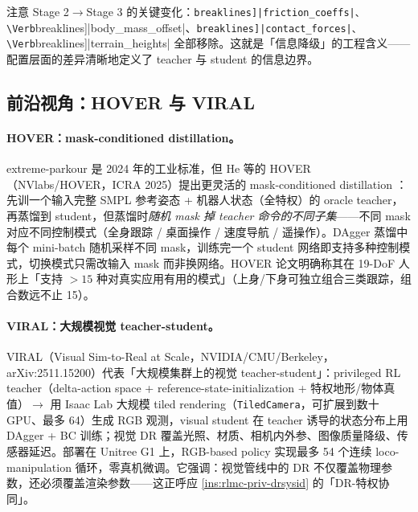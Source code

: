 注意 Stage 2$\to$Stage 3 的关键变化：\Verb[breaklines]|friction_coeffs|、\Verb[breaklines]|body_mass_offset|、\Verb[breaklines]|contact_forces|、\Verb[breaklines]|terrain_heights| 全部移除。这就是「信息降级」的工程含义——配置层面的差异清晰地定义了 teacher 与 student 的信息边界。

\subsection{前沿视角：HOVER 与 VIRAL}
\label{sec:rlmc-priv-frontier}

\paragraph{HOVER：mask-conditioned distillation。} extreme-parkour 是 2024 年的工业标准，但 He 等的 HOVER（NVlabs/HOVER，ICRA 2025）提出更灵活的 mask-conditioned distillation \cite{he2025hover}：先训一个输入完整 SMPL 参考姿态 + 机器人状态（全特权）的 oracle teacher，再蒸馏到 student，但蒸馏时\emph{随机 mask 掉 teacher 命令的不同子集}——不同 mask 对应不同控制模式（全身跟踪 / 桌面操作 / 速度导航 / 遥操作）。DAgger 蒸馏中每个 mini-batch 随机采样不同 mask，训练完一个 student 网络即支持多种控制模式，切换模式只需改输入 mask 而非换网络。HOVER 论文明确称其在 19-DoF 人形上「支持 $>15$ 种对真实应用有用的模式」（上身/下身可独立组合三类跟踪，组合数远不止 15）。

\paragraph{VIRAL：大规模视觉 teacher-student。} VIRAL（Visual Sim-to-Real at Scale，NVIDIA/CMU/Berkeley，arXiv:2511.15200）代表「大规模集群上的视觉 teacher-student」\cite{he2025viral}：privileged RL teacher（delta-action space + reference-state-initialization + 特权地形/物体真值）$\to$ 用 Isaac Lab 大规模 tiled rendering（\verb|TiledCamera|，可扩展到数十 GPU、最多 64）生成 RGB 观测，visual student 在 teacher 诱导的状态分布上用 DAgger + BC 训练；视觉 DR 覆盖光照、材质、相机内外参、图像质量降级、传感器延迟。部署在 Unitree G1 上，RGB-based policy 实现最多 54 个连续 loco-manipulation 循环，零真机微调。它强调：视觉管线中的 DR 不仅覆盖物理参数，还必须覆盖渲染参数——这正呼应 \cref{ins:rlmc-priv-drsysid} 的「DR-特权协同」。

